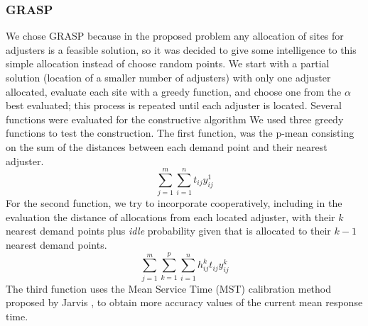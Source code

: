 \subsubsection{GRASP}
We chose GRASP
because
in the proposed problem
any allocation of sites for adjusters
is a feasible solution,
so it was decided to give some intelligence
to this simple allocation
instead of choose
random points.
We start with a partial solution
(location of a smaller number of adjusters)
with only one adjuster allocated,
evaluate each site with a greedy function,
and choose one from the $\alpha$ best evaluated;
this process is repeated
until each adjuster is located.
Several functions were evaluated
for the constructive algorithm
We used three greedy functions
to test the construction.
The first function,
was the p-mean
consisting
on the sum of the distances
between each demand point 
and their nearest adjuster.
\begin{equation}
  \label{eq:grasp1}
  \sum_{j=1}^{m}{
    \sum_{i=1}^{n}{
      t_{ij}y_{ij}^{1}
    }
  }
\end{equation}
For the second function,
we try to incorporate cooperatively,
including in the evaluation
the distance of allocations
from each located adjuster,
with their $k$ nearest demand points
plus \textit{idle} probability
given that is allocated
to their $k-1$ nearest demand points.
\begin{equation}
  \label{eq:grasp2}
  \sum_{j=1}^{m}{
    \sum_{k=1}^{p}{
      \sum_{i=1}^{n}{
        h_{ij}^{k}t_{ij}y_{ij}^{k}
      }
    }
  }
\end{equation}
The third function
uses the Mean Service Time (MST) calibration method
proposed by Jarvis \cite{jarvis1985approximating},
to obtain more accuracy values
of the current mean response time.
